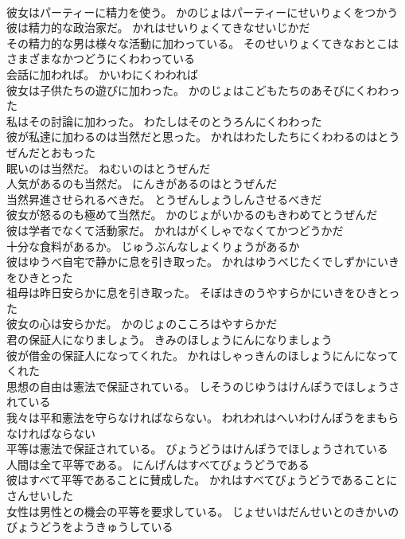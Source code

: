 \documentclass[8pt]{extreport}
\begin{document}
\begin{CJK}{UTF8}{min}
\\	彼女はパーティーに精力を使う。	かのじょはパーティーにせいりょくをつかう 
\\	彼は精力的な政治家だ。	かれはせいりょくてきなせいじかだ 
\\	その精力的な男は様々な活動に加わっている。	そのせいりょくてきなおとこはさまざまなかつどうにくわわっている 
\\	会話に加われば。	かいわにくわわれば 
\\	彼女は子供たちの遊びに加わった。	かのじょはこどもたちのあそびにくわわった 
\\	私はその討論に加わった。	わたしはそのとうろんにくわわった 
\\	彼が私達に加わるのは当然だと思った。	かれはわたしたちにくわわるのはとうぜんだとおもった 
\\	眠いのは当然だ。	ねむいのはとうぜんだ 
\\	人気があるのも当然だ。	にんきがあるのはとうぜんだ 
\\	当然昇進させられるべきだ。	とうぜんしょうしんさせるべきだ 
\\	彼女が怒るのも極めて当然だ。	かのじょがいかるのもきわめてとうぜんだ 
\\	彼は学者でなくて活動家だ。	かれはがくしゃでなくてかつどうかだ 
\\	十分な食料があるか。	じゅうぶんなしょくりょうがあるか 
\\	彼はゆうべ自宅で静かに息を引き取った。	かれはゆうべじたくでしずかにいきをひきとった 
\\	祖母は昨日安らかに息を引き取った。	そぼはきのうやすらかにいきをひきとった 
\\	彼女の心は安らかだ。	かのじょのこころはやすらかだ 
\\	君の保証人になりましょう。	きみのほしょうにんになりましょう 
\\	彼が借金の保証人になってくれた。	かれはしゃっきんのほしょうにんになってくれた 
\\	思想の自由は憲法で保証されている。	しそうのじゆうはけんぽうでほしょうされている 
\\	我々は平和憲法を守らなければならない。	われわれはへいわけんぽうをまもらなければならない 
\\	平等は憲法で保証されている。	びょうどうはけんぽうでほしょうされている 
\\	人間は全て平等である。	にんげんはすべてびょうどうである 
\\	彼はすべて平等であることに賛成した。	かれはすべてびょうどうであることにさんせいした 
\\	女性は男性との機会の平等を要求している。	じょせいはだんせいとのきかいのびょうどうをようきゅうしている 

\end{CJK}
\end{document}
